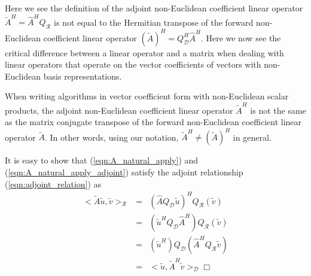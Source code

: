 Here we see the definition of the adjoint non-Euclidean coefficient linear
operator $\tilde{A}^H=\hat{A}^H Q_{\mathcal{R}}$ is not equal to the Hermitian
transpose of the forward non-Euclidean coefficient linear operator
$(\tilde{A})^H = Q_{\mathcal{D}}^H {}\hat{A}^H$.  Here we now see the critical
difference between a linear operator and a matrix when dealing with linear
operators that operate on the vector coefficients of vectors with
non-Euclidean basis representations.

\begin{dumb_fact}
When writing algorithms in vector coefficient form with non-Euclidean scalar
products, the adjoint non-Euclidean coefficient linear operator $\tilde{A}^H$
is not the same as the matrix conjugate transpose of the forward non-Euclidean
coefficient linear operator $\tilde{A}$.  In other words, using our notation,
$\tilde{A}^H {}\ne (\tilde{A})^H$ in general.
\end{dumb_fact}

It is easy to show that (\ref{eqn:A_natural_apply}) and
(\ref{eqn:A_natural_apply_adjoint}) satisfy the adjoint relationship
(\ref{eqn:adjoint_relation}) as
%
\begin{eqnarray}
<\tilde{A} \tilde{u}, \tilde{v}>_{\mathcal{R}}
& = & (\hat{A} Q_{\mathcal{D}} \tilde{u} )^H Q_{\mathcal{R}} (\tilde{v}) \nonumber \\
& = & ( \tilde{u}^H Q_{\mathcal{D}} \hat{A}^H ) Q_{\mathcal{R}} (\tilde{v}) \nonumber \\
& = & (\tilde{u}^H ) Q_{\mathcal{D}} ( \hat{A}^H Q_{\mathcal{R}} \tilde{v}) \nonumber \\
& = & <\tilde{u}, \tilde{A}^H \tilde{v}>_{\mathcal{D}} \Box
\label{eqn:adjoint_relation_proved}
\end{eqnarray}
%


